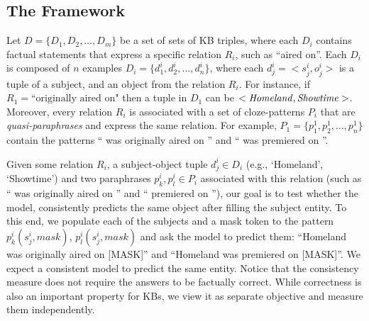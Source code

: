 \subsection{The Framework}
\label{sec:framework}
Let
$D = \{D_1, D_2,
\dots, D_m\}$
be a set of sets of KB triples,
where each $D_i$ contains factual statements
that express a specific relation $R_i$, such as ``aired
on''. Each $D_i$ is composed of $n$ examples $D_i = \{d_1^i,
d_2^i, \dots, d_n^i\}$, where each $d_j^i = <s_j^i,o_j^i>$ is a tuple of a subject, and an object from the relation $R_i$. 
For instance, if $R_1=\text{``originally
  aired on"}$ then a tuple in $D_1$ can be $<\text{\textit{Homeland}}, \text{\textit{Showtime}}>$. Moreover, every relation $R_i$ is associated with a set of cloze-patterns $P_i$ that are \textit{quasi-paraphrases} and express the same relation. For example, $P_1=\{p_1^1, p_2^1, \dots, p_n^1\}$ contain the patterns ``\subj{} was originally aired on \obj{}'' and ``\subj{} was premiered on \obj{}''.

Given some relation $R_i$, a subject-object tuple $d_j^i \in D_i$ (e.g., `Homeland', `Showtime') and two paraphrases $p_k^i, p_l^i \in P_i$ associated with this relation (such as ``\subj{} was originally aired on \obj{}'' and ``\subj{} premiered on \obj{}''), our goal is to test whether the model, consistently predicts the same object after filling the subject entity. To this end, we populate each of the subjects and a mask token to the pattern $p_k^i(s_j^i,mask)$, $p_l^i(s_j^i,mask)$
and ask the model to predict them: ``Homeland was originally aired on [MASK]'' and ``Homeland was premiered on [MASK]''.  We expect a consistent model to predict the same entity. Notice that the consistency measure does not require the answers to be factually correct. While correctness is also an important property for KBs, we view it as separate objective and measure them independently. 


